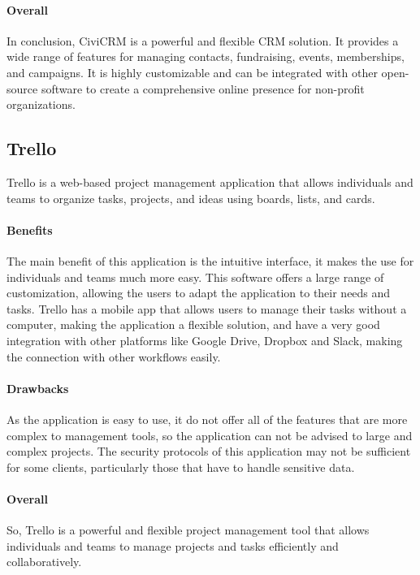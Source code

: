 \documentclass{article}
\begin{document}
\paragraph{Overall}

 In conclusion, CiviCRM is a powerful and flexible CRM solution. It provides a wide range of features for managing contacts, fundraising, events, memberships, and campaigns. It is highly customizable and can be integrated with other open-source software to create a comprehensive online presence for non-profit organizations.

\subsection{Trello}

Trello is a web-based project management application that allows individuals and teams to organize tasks, projects, and ideas using boards, lists, and cards.

\paragraph{Benefits}

The main benefit of this application is the intuitive interface, it makes the use for individuals and teams much more easy. This software offers a large range of customization, allowing the users to adapt the application to their needs and tasks. Trello has a mobile app that allows users to manage their tasks without a computer, making the application a flexible solution, and have a very good integration with other platforms like Google Drive, Dropbox and Slack, making the connection with other workflows easily.

\paragraph{Drawbacks}

As the application is easy to use, it do not offer all of the features that are more complex to management tools, so the application can not be advised to large and complex projects. The security protocols of this application may not be sufficient for some clients, particularly those that have to handle sensitive data. 

\paragraph{Overall}

So, Trello is a powerful and flexible project management tool that allows individuals and teams to manage projects and tasks efficiently and collaboratively.
\end{document}
